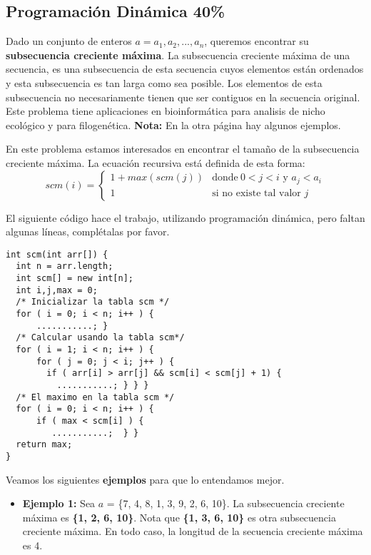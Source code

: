 \documentclass[10 pt]{article}
\begin{document}
\begin{multicols}{2}
\section{Programación Dinámica 40\%}
Dado un conjunto de enteros $a = a_1, a_2, ... , a_n$, queremos encontrar su \textbf{subsecuencia creciente máxima}. La subsecuencia creciente máxima de una secuencia, es una subsecuencia de esta secuencia cuyos elementos están ordenados y esta subsecuencia es tan larga como sea posible. Los elementos de esta subsecuencia no necesariamente tienen que ser contiguos en la secuencia original. Este problema tiene aplicaciones en bioinformática para analisis de nicho ecológico y para filogenética. 
\textbf{Nota:} En la otra página hay algunos ejemplos.

En este problema estamos interesados en encontrar el tamaño de la subsecuencia creciente máxima. La ecuación recursiva está definida de esta forma:
$$
scm(i)= \left\{ \begin{array}{ll}
             1 + max( scm(j) ) & \text{donde} \ 0 < j < i \text{ y } a_j < a_i \\
             1 & \text{si no existe tal valor } j
             \end{array}
   \right.
$$   


El siguiente código hace el trabajo, utilizando programación dinámica, pero faltan algunas líneas, complétalas por favor.
\begin{lstlisting}
int scm(int arr[]) {
  int n = arr.length;
  int scm[] = new int[n];
  int i,j,max = 0;
  /* Inicializar la tabla scm */
  for ( i = 0; i < n; i++ ) {
      ...........; }
  /* Calcular usando la tabla scm*/
  for ( i = 1; i < n; i++ ) {
      for ( j = 0; j < i; j++ ) {
        if ( arr[i] > arr[j] && scm[i] < scm[j] + 1) {
          ...........; } } }
  /* El maximo en la tabla scm */
  for ( i = 0; i < n; i++ ) {
      if ( max < scm[i] ) {
         ...........;  } }
  return max;
}
\end{lstlisting}

Veamos los siguientes \textbf{ejemplos} para que lo entendamos mejor.

\begin{itemize}
	\item \textbf{Ejemplo 1: } Sea $a$ = \{7, 4, 8, 1, 3, 9, 2, 6, 10\}.  La subsecuencia creciente máxima es \textbf{\{1, 2, 6, 10\}}. Nota que \textbf{\{1, 3, 6, 10\}} es otra subsecuencia creciente máxima. En todo caso, la longitud de la secuencia creciente máxima es 4.


\end{itemize}
\end{multicols}
\end{document}
